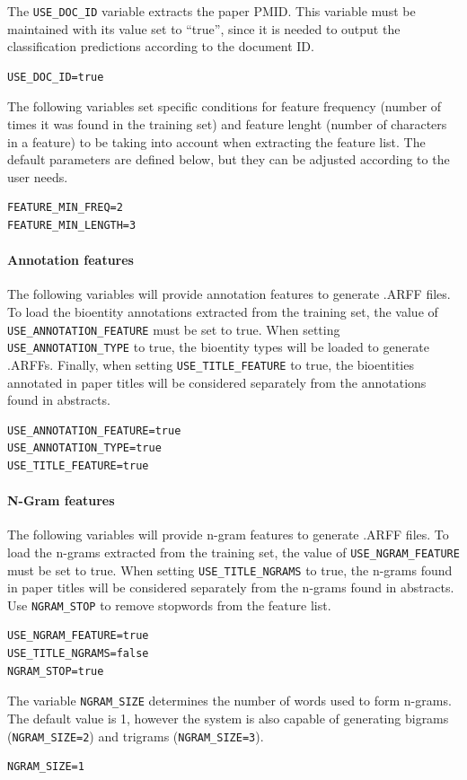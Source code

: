 \documentclass[11pt]{article}
\begin{document}
The \texttt{USE\_DOC\_ID} variable extracts the paper PMID.
This variable must be maintained with its value set to ``true'', 
since it is needed to output the classification predictions according to the document ID.
\begin{lstlisting}
USE_DOC_ID=true
\end{lstlisting}

The following variables set specific conditions for feature frequency (number of times it was found in the training set)
and feature lenght (number of characters in a feature) to be taking into account when extracting the feature list.
The default parameters are defined below, but they can be adjusted according to the user needs.
\begin{lstlisting}
FEATURE_MIN_FREQ=2
FEATURE_MIN_LENGTH=3
\end{lstlisting}

\paragraph{Annotation features}
The following variables will provide annotation features to generate .ARFF files.
To load the bioentity annotations extracted from the training set, the value of \texttt{USE\_ANNOTATION\_FEATURE} must be set to true.
When setting \texttt{USE\_ANNOTATION\_TYPE} to true, the bioentity types will be loaded to generate .ARFFs.
Finally, when setting \texttt{USE\_TITLE\_FEATURE} to true, the bioentities annotated in paper titles will be 
considered separately from the annotations found in abstracts.
\begin{lstlisting}
USE_ANNOTATION_FEATURE=true
USE_ANNOTATION_TYPE=true
USE_TITLE_FEATURE=true
\end{lstlisting}

\paragraph{N-Gram features}
The following variables will provide n-gram features to generate .ARFF files.
To load the n-grams extracted from the training set, the value of \texttt{USE\_NGRAM\_FEATURE} must be set to true.
When setting \texttt{USE\_TITLE\_NGRAMS} to true, the n-grams found in paper titles will be 
considered separately from the n-grams found in abstracts.
Use \texttt{NGRAM\_STOP} to remove stopwords from the feature list.
\begin{lstlisting}
USE_NGRAM_FEATURE=true
USE_TITLE_NGRAMS=false
NGRAM_STOP=true
\end{lstlisting}
The variable \texttt{NGRAM\_SIZE} determines the number of words used to
form n-grams. The default value is 1, however the system is also capable of generating 
bigrams (\texttt{NGRAM\_SIZE=2}) and trigrams (\texttt{NGRAM\_SIZE=3}). 
\begin{lstlisting}
NGRAM_SIZE=1
\end{lstlisting}
\end{document}
